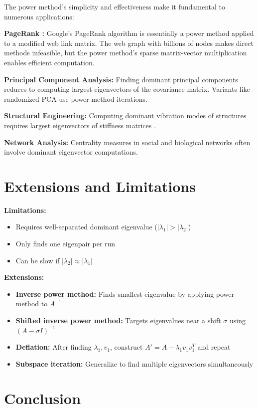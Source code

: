 \documentclass[11pt,a4paper]{article}
\begin{document}
The power method's simplicity and effectiveness make it fundamental to numerous applications:

\textbf{PageRank \cite{page1999pagerank}:} Google's PageRank algorithm is essentially a power method applied to a modified web link matrix. The web graph with billions of nodes makes direct methods infeasible, but the power method's sparse matrix-vector multiplication enables efficient computation.

\textbf{Principal Component Analysis:} Finding dominant principal components reduces to computing largest eigenvectors of the covariance matrix. Variants like randomized PCA use power method iterations.

\textbf{Structural Engineering:} Computing dominant vibration modes of structures requires largest eigenvectors of stiffness matrices \cite{bathe2006finite}.

\textbf{Network Analysis:} Centrality measures in social and biological networks often involve dominant eigenvector computations.

\section{Extensions and Limitations}

\textbf{Limitations:}
\begin{itemize}
    \item Requires well-separated dominant eigenvalue ($|\lambda_1| > |\lambda_2|$)
    \item Only finds one eigenpair per run
    \item Can be slow if $|\lambda_2| \approx |\lambda_1|$
\end{itemize}

\textbf{Extensions:}
\begin{itemize}
    \item \textbf{Inverse power method:} Finds smallest eigenvalue by applying power method to $A^{-1}$
    \item \textbf{Shifted inverse power method:} Targets eigenvalues near a shift $\sigma$ using $(A - \sigma I)^{-1}$
    \item \textbf{Deflation:} After finding $\lambda_1, v_1$, construct $A' = A - \lambda_1 v_1 v_1^T$ and repeat
    \item \textbf{Subspace iteration:} Generalize to find multiple eigenvectors simultaneously
\end{itemize}

\section{Conclusion}
\end{document}
